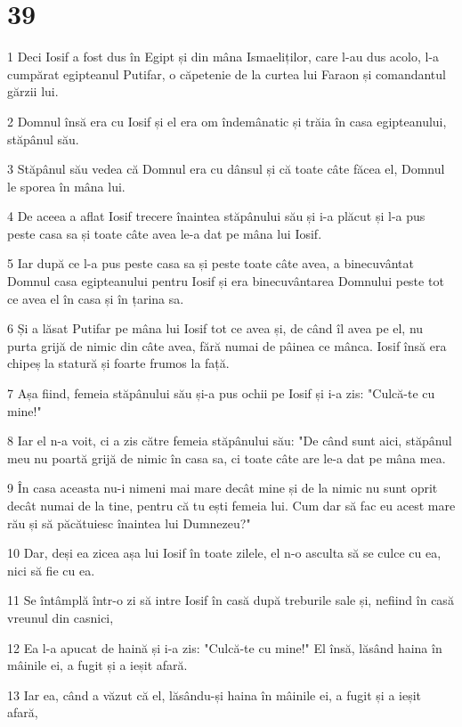 \chapter{39}

\par 1 Deci Iosif a fost dus în Egipt și din mâna Ismaeliților, care l-au dus acolo, l-a cumpărat egipteanul Putifar, o căpetenie de la curtea lui Faraon și comandantul gărzii lui.
\par 2 Domnul însă era cu Iosif și el era om îndemânatic și trăia în casa egipteanului, stăpânul său.
\par 3 Stăpânul său vedea că Domnul era cu dânsul și că toate câte făcea el, Domnul le sporea în mâna lui.
\par 4 De aceea a aflat Iosif trecere înaintea stăpânului său și i-a plăcut și l-a pus peste casa sa și toate câte avea le-a dat pe mâna lui Iosif.
\par 5 Iar după ce l-a pus peste casa sa și peste toate câte avea, a binecuvântat Domnul casa egipteanului pentru Iosif și era binecuvântarea Domnului peste tot ce avea el în casa și în țarina sa.
\par 6 Și a lăsat Putifar pe mâna lui Iosif tot ce avea și, de când îl avea pe el, nu purta grijă de nimic din câte avea, fără numai de pâinea ce mânca. Iosif însă era chipeș la statură și foarte frumos la față.
\par 7 Așa fiind, femeia stăpânului său și-a pus ochii pe Iosif și i-a zis: "Culcă-te cu mine!"
\par 8 Iar el n-a voit, ci a zis către femeia stăpânului său: "De când sunt aici, stăpânul meu nu poartă grijă de nimic în casa sa, ci toate câte are le-a dat pe mâna mea.
\par 9 În casa aceasta nu-i nimeni mai mare decât mine și de la nimic nu sunt oprit decât numai de la tine, pentru că tu ești femeia lui. Cum dar să fac eu acest mare rău și să păcătuiesc înaintea lui Dumnezeu?"
\par 10 Dar, deși ea zicea așa lui Iosif în toate zilele, el n-o asculta să se culce cu ea, nici să fie cu ea.
\par 11 Se întâmplă într-o zi să intre Iosif în casă după treburile sale și, nefiind în casă vreunul din casnici,
\par 12 Ea l-a apucat de haină și i-a zis: "Culcă-te cu mine!" El însă, lăsând haina în mâinile ei, a fugit și a ieșit afară.
\par 13 Iar ea, când a văzut că el, lăsându-și haina în mâinile ei, a fugit și a ieșit afară,
